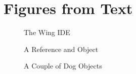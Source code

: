 \documentclass[letterpaper,10pt,english]{sphinxmanual}
\begin{document}
\section{Figures from Text}
\label{\detokenize{chap1/chap1:figures-from-text}}
\begin{figure}[htbp]
\centering
\capstart

\noindent{}
\caption{The Wing IDE}\label{\detokenize{chap1/chap1:id1}}\end{figure}

\begin{figure}[htbp]
\centering
\capstart

\noindent{}
\caption{A Reference and Object}\label{\detokenize{chap1/chap1:id2}}\end{figure}

\begin{figure}[htbp]
\centering
\capstart

\noindent{}
\caption{A Couple of Dog Objects}\label{\detokenize{chap1/chap1:id3}}\end{figure}
\end{document}
